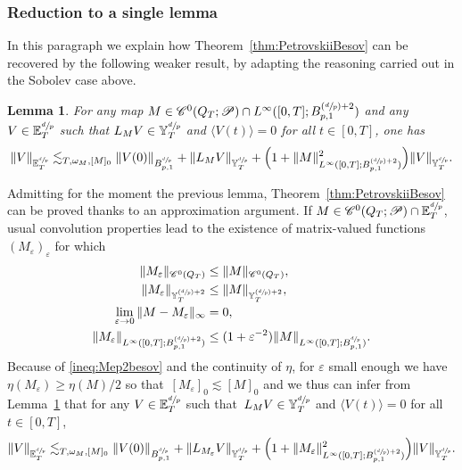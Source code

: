 \documentclass[10pt]{amsart}
\newcommand{\Psfrac}[2]{(\sfrac{#1}{#2})}
\newtheorem{lem}[prop]{Lemma}
\theoremstyle{definition}
\let\ep\varepsilon
\begin{document}
\subsubsection{Reduction to a single lemma}\label{subsec:redlipbesov}
In this paragraph we explain how Theorem~\ref{thm:PetrovskiiBesov} can be recovered by the following weaker result, by adapting the reasoning carried out in the Sobolev case above.
\begin{lem}\label{lem:goalL2:weakbesov}
For any map $M\in \mathscr{C}^{0}(Q_T;\mathscr{P})\cap L^\infty ([0,T];B^{\Psfrac dp+2}_{p,1}) $ and any $V\in {\mathbb E}_T^{\sfrac dp}$ such that $L_M V\in {\mathbb Y}_T^{\sfrac dp}$ and $\langle V(t)\rangle = 0$ for all $t\in[0,T]$, one has\vspace*{-3pt}
\[
\|V\|_{ {\mathbb E}_T^{\sfrac dp}} \lesssim_{T,\omega_M,[M]_0} \|V(0)\|_{B^{\sfrac dp}_{p,1}} + \| L_M V \|_{{\mathbb Y}_T^{\sfrac dp} } + \Bigl(1+\|M\|^2_{ L^\infty ([0,T];B^{\Psfrac dp+2}_{p,1}) }\Bigr) \|V\|_ {{\mathbb Y}_T^{\sfrac dp}}.
\]
\end{lem}
Admitting for the moment the previous lemma, Theorem~\ref{thm:PetrovskiiBesov}
can be proved thanks to an approximation argument. If $M\in\mathscr{C}^{0}(Q_T;\mathscr{P})\cap {\mathbb E}^{\sfrac dp}_T $, usual convolution properties lead to the existence of matrix-valued functions $(M_\ep)_\ep$ for which\vspace*{-3pt}
\begin{align}
\label{ineq:Mep1besov}\|M_\ep\|_{\mathscr{C}^{0}(Q_T)}&\leq \|M\|_{\mathscr{C}^{0}(Q_T)},\\
\label{ineq:Mep11besov}\|M_\ep\|_{{\mathbb Y}_T^{\Psfrac dp+2}}&\leq \|M\|_{{\mathbb Y}_T^{\Psfrac dp+2}},\\
\label{ineq:Mep2besov}\lim_{\ep \to 0}\|M-M_\ep\|_\infty &= 0,\\
\label{ineq:Mep3besov}\|M_\ep\|_{ L^\infty ([0,T];B^{\Psfrac dp+2}_{p,1}) }&\leq (1+\ep^{-2})\|M\|_{ L^\infty ([0,T];B^{\sfrac dp}_{p,1}) }.
\end{align}
Because of \eqref{ineq:Mep2besov} and the continuity of $\eta$, for $\ep$ small enough we have $\eta(M_\ep)\geq \eta(M)/2$ so that~$[M_\ep]_0\lesssim[M]_0$ and we thus can infer from Lemma~\ref{lem:goalL2:weakbesov} that for any $V\in {\mathbb E}^{\sfrac dp}_T$ such that~$L_M V\in {\mathbb Y}^{\sfrac dp}_T$ and $\langle V(t)\rangle = 0$ for all $t\in[0,T]$,\vspace*{-3pt}
\[
\|V\|_{{\mathbb E}^{\sfrac dp}_T} \lesssim_{T,\omega_M,[M]_0} \|V(0)\|_{B^{\sfrac dp}_{p,1}} + \| L_{M_\ep} V \|_{{\mathbb Y}^{\sfrac dp}_T } + \Bigl(1+\|M_\ep\|^2_{ L^\infty ([0,T];B^{\Psfrac dp+2}_{p,1}) }\Bigr) \|V\|_ {{\mathbb Y}^{\sfrac dp}_T}.
\]
\end{document}
